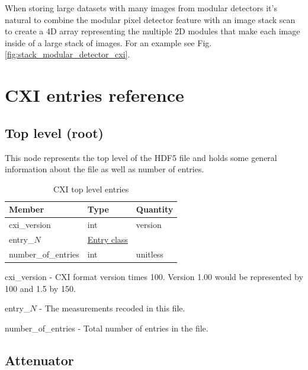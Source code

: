 \documentclass[usletter,11pt]{article}
\newcommand{\member}[2]
{ \noindent
{ \color{softBlue}  #1 - } #2
\vspace{0.2cm}
}
\begin{document}
When storing large datasets with many images from modular detectors it's natural
to combine the modular pixel detector feature with an image stack
scan to create a 4D array representing the multiple 2D modules that make
each image inside of a large stack of images. For an example see Fig. \ref{fig:stack_modular_detector_cxi}.
\clearpage
\appendix

 

\section{CXI entries reference}

\subsection{Top level (root)}
\label{table:top}

This node represents the top level of the HDF5 file and holds some
general information about the file as well as number of entries.

\begin{table}[h!]\sffamily
\footnotesize
\caption{CXI top level entries}

\begin{tabular}{p{4.5cm} p{4.5cm}  p{2.5cm}}
\toprule
\bfseries Member     & \bfseries Type & \bfseries Quantity \\
\midrule

cxi\_version & int & version  \\
entry\_$N$ &  \hyperref[table:entry]{Entry class} & \\
number\_of\_entries & int & unitless \\
\bottomrule
\end{tabular}
\end{table}

\member{cxi\_version}{CXI format version times 100. Version 1.00 would
  be represented by 100 and 1.5 by 150.}

\member{entry\_$N$}{The measurements recoded in this file.}

\member{number\_of\_entries}{Total number of entries in the file.}

\subsection{Attenuator}
\label{table:attenuator}
\end{document}

